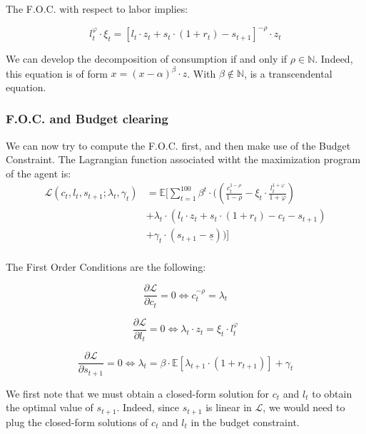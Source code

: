 \documentclass{article}
\begin{document}
The F.O.C. with respect to labor implies: 

\begin{equation}
    l_{t}^{\varphi}\cdot \xi_{t} = \left[l_{t}\cdot z_{t} + s_{t}\cdot(1+r_{t})- s_{t+1}\right]^{-\rho}\cdot z_{t}
\end{equation}

We can develop the decomposition of consumption if and only if $\rho \in \mathbb{N}$.
Indeed, this equation is of form $x = (x-\alpha)^{\beta} \cdot z$.
With $\beta\notin \mathbb{N}$, is a transcendental equation.

\subsubsection{F.O.C. and Budget clearing}

We can now try to compute the F.O.C. first, and then make use of the Budget Constraint.
The Lagrangian function associated witht the maximization program of the agent is: 
\begin{equation}
    \begin{split}
        \mathcal{L}(c_{t},l_{t},s_{t+1};\lambda_t,\gamma_{t}) &
        = \mathbb{E}\Big[\sum_{t=1}^{100} \beta^{t}\cdot ((\frac{c_{t}^{1-\rho}}{1-\rho}-\xi_{t}\cdot\frac{l_{t}^{1+\varphi}}{1+\varphi}) \\
        & +\lambda_{t}\cdot \left(l_{t}\cdot z_{t}+s_{t}\cdot (1+r_{t})-c_{t}-s_{t+1}\right) \\ 
        & + \gamma_{t}\cdot \left(s_{t+1}-\underline{s}\right))\Big] \\ 
    \end{split}
\end{equation}

The First Order Conditions are the following:

$$\frac{\partial \mathcal{L}}{\partial c_{t}} = 0 \iff c_{t}^{-\rho} = \lambda_{t}$$


$$\frac{\partial \mathcal{L}}{\partial l_{t}} = 0 \iff \lambda_{t}\cdot z_{t} = \xi_{t}\cdot l_{t}^{\varphi}$$


$$\frac{\partial \mathcal{L}}{\partial s_{t+1}} = 0 \iff \lambda_{t} = \beta \cdot \mathbb{E}\left[\lambda_{t+1}\cdot (1+r_{t+1})\right] + \gamma_{t}$$

We first note that we must obtain a closed-form solution for $c_{t}$ and $l_{t}$ to obtain 
the optimal value of $s_{t+1}$. 
Indeed, since $s_{t+1}$ is linear in $\mathcal{L}$, we would need to plug the closed-form
solutions of $c_{t}$ and $l_{t}$ in the budget constraint. \\
\end{document}
